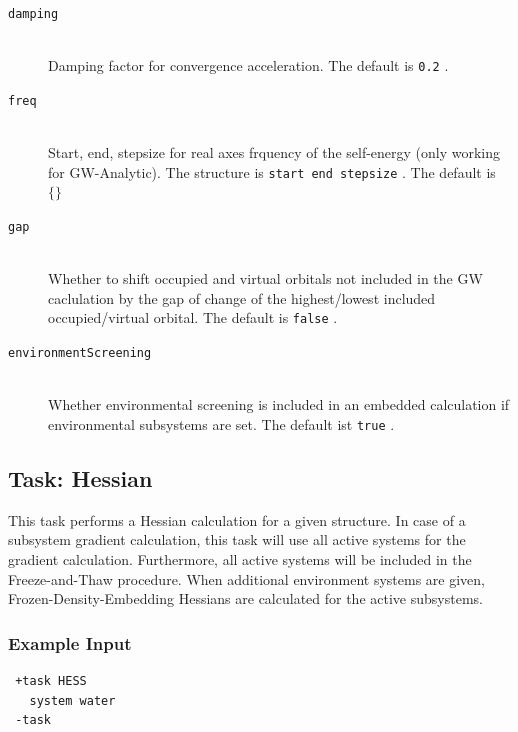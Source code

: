 \documentclass[bibliography=totocnumbered,a4paper,10pt,oneside]{scrbook}
\newcommand{\ttt}[1]{%
  \begingroup\setlength{\fboxsep}{1pt}%
  \colorbox{serenity-green!30}{\texttt{\hspace*{2pt}\vphantom{(g}#1\hspace*{2pt}}}%
  \endgroup
}
\begin{document}
\begin{description}
  \item [\texttt{damping}]\hfill \\
  Damping factor for convergence acceleration. The default is \ttt{0.2}.
  \item [\texttt{freq}]\hfill \\
  Start, end, stepsize for real axes frquency of the self-energy (only working for GW-Analytic). The structure is \ttt{start end stepsize}. The default is \ttt{$\{\}$}
  \item [\texttt{gap}]\hfill \\
  Whether to shift occupied and virtual orbitals not included in the GW caclulation by the gap of change of the highest/lowest included occupied/virtual orbital. The default is \ttt{false}.
  \item [\texttt{environmentScreening}]\hfill \\
  Whether environmental screening is included in an embedded calculation if environmental subsystems are set. The default ist \ttt{true}.
\end{description}


\subsection{Task: Hessian}
This task performs a Hessian calculation for a given structure. In case of a subsystem gradient calculation, this task will use all active systems for the gradient calculation. Furthermore, all active systems will be included in the Freeze-and-Thaw procedure. When additional environment systems are given, Frozen-Density-Embedding Hessians are calculated for the active subsystems.
\subsubsection{Example Input}
\begin{lstlisting}
 +task HESS
   system water
 -task
\end{lstlisting}
\end{document}
